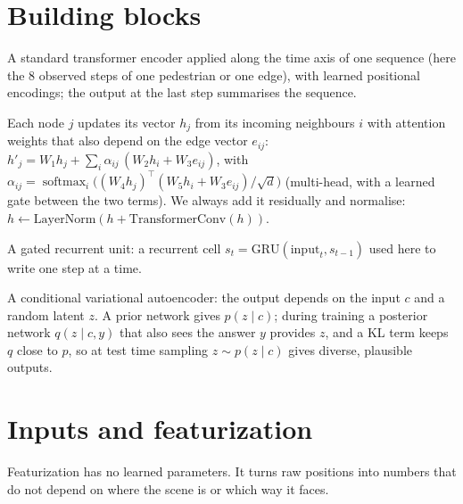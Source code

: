 \documentclass[10pt]{article}
\begin{document}
\section{Building blocks}\label{sec:blocks}
\begin{description}[leftmargin=0pt, itemsep=3pt]
\item[Temporal transformer.] A standard transformer encoder applied along the time axis of one sequence
(here the 8 observed steps of one pedestrian or one edge), with learned positional encodings; the output at
the last step summarises the sequence.
\item[Graph attention (\texttt{TransformerConv}, PyTorch Geometric).] Each node $j$ updates its vector $h_j$ from
its incoming neighbours $i$ with attention weights that also depend on the edge vector $e_{ij}$:
$h'_j = W_1h_j + \sum_{i}\alpha_{ij}\,(W_2h_i+W_3e_{ij})$, with
$\alpha_{ij}=\operatorname{softmax}_i\big((W_4h_j)^\top(W_5h_i+W_3e_{ij})/\sqrt d\big)$ (multi-head, with a learned gate between
the two terms). We always add it residually and normalise: $h\leftarrow\mathrm{LayerNorm}(h+\mathrm{TransformerConv}(h))$.
\item[GRU.] A gated recurrent unit: a recurrent cell $s_{t}=\mathrm{GRU}(\text{input}_t, s_{t-1})$ used here to write
one step at a time.
\item[CVAE.] A conditional variational autoencoder: the output depends on the input $c$ and a random latent
$z$. A prior network gives $p(z\mid c)$; during training a posterior network $q(z\mid c,y)$ that also sees the
answer $y$ provides $z$, and a KL term keeps $q$ close to $p$, so at test time sampling $z\sim p(z\mid c)$ gives
diverse, plausible outputs.
\end{description}

\section{Inputs and featurization}\label{sec:features}
Featurization has no learned parameters. It turns raw positions into numbers that do not depend on where the
scene is or which way it faces.
\end{document}
